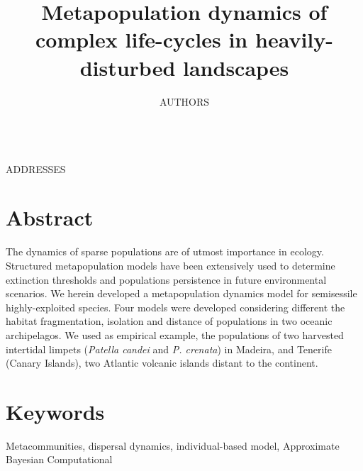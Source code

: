 \documentclass[12pt]{article}
\date{}
\begin{document}
\begin{flushleft}
\title{Metapopulation dynamics of complex life-cycles in heavily-disturbed landscapes}
\maketitle
\author{AUTHORS}
\\
\small{ADDRESSES}
\\
\section{Abstract}
The dynamics of sparse populations are of utmost importance in ecology. Structured metapopulation models have been extensively used to determine extinction thresholds and populations persistence in future environmental scenarios. We herein developed a metapopulation dynamics model for semisessile highly-exploited species. Four models were developed considering different the habitat fragmentation, isolation and distance of populations in two oceanic archipelagos. We used as empirical example, the populations of two harvested intertidal limpets (\textit{Patella candei} and \textit{P. crenata}) in Madeira, and Tenerife (Canary Islands), two Atlantic volcanic islands distant to the continent.

\section{Keywords}
Metacommunities, dispersal dynamics, individual-based model, Approximate Bayesian Computational


\end{flushleft}
\end{document}
